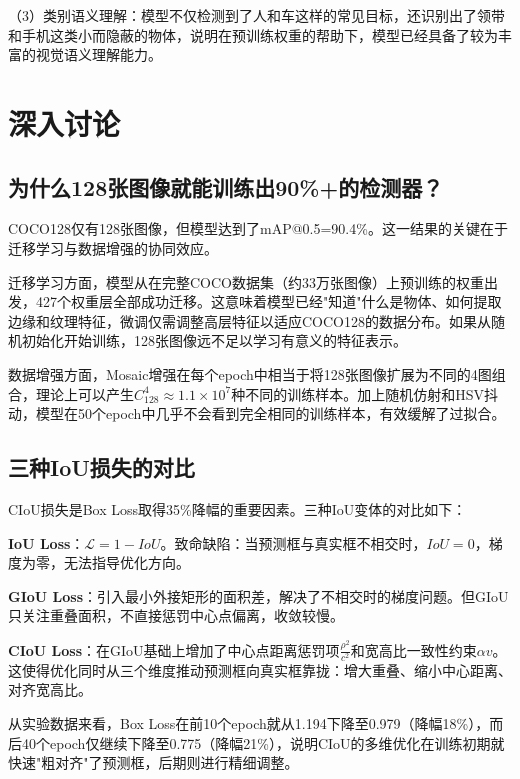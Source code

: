 \documentclass[12pt,a4paper]{article}
\begin{document}
（3）类别语义理解：模型不仅检测到了人和车这样的常见目标，还识别出了领带和手机这类小而隐蔽的物体，说明在预训练权重的帮助下，模型已经具备了较为丰富的视觉语义理解能力。

\section{深入讨论}

\subsection{为什么128张图像就能训练出90\%+的检测器？}

COCO128仅有128张图像，但模型达到了mAP@0.5=90.4\%。这一结果的关键在于迁移学习与数据增强的协同效应。

迁移学习方面，模型从在完整COCO数据集（约33万张图像）上预训练的权重出发，427个权重层全部成功迁移。这意味着模型已经"知道"什么是物体、如何提取边缘和纹理特征，微调仅需调整高层特征以适应COCO128的数据分布。如果从随机初始化开始训练，128张图像远不足以学习有意义的特征表示。

数据增强方面，Mosaic增强在每个epoch中相当于将128张图像扩展为不同的4图组合，理论上可以产生$C_{128}^{4} \approx 1.1 \times 10^7$种不同的训练样本。加上随机仿射和HSV抖动，模型在50个epoch中几乎不会看到完全相同的训练样本，有效缓解了过拟合。

\subsection{三种IoU损失的对比}

CIoU损失是Box Loss取得35\%降幅的重要因素。三种IoU变体的对比如下：

\textbf{IoU Loss}：$\mathcal{L} = 1 - IoU$。致命缺陷：当预测框与真实框不相交时，$IoU=0$，梯度为零，无法指导优化方向。

\textbf{GIoU Loss}：引入最小外接矩形的面积差，解决了不相交时的梯度问题。但GIoU只关注重叠面积，不直接惩罚中心点偏离，收敛较慢。

\textbf{CIoU Loss}：在GIoU基础上增加了中心点距离惩罚项$\frac{\rho^2}{c^2}$和宽高比一致性约束$\alpha v$。这使得优化同时从三个维度推动预测框向真实框靠拢：增大重叠、缩小中心距离、对齐宽高比。

从实验数据来看，Box Loss在前10个epoch就从1.194下降至0.979（降幅18\%），而后40个epoch仅继续下降至0.775（降幅21\%），说明CIoU的多维优化在训练初期就快速"粗对齐"了预测框，后期则进行精细调整。
\end{document}
